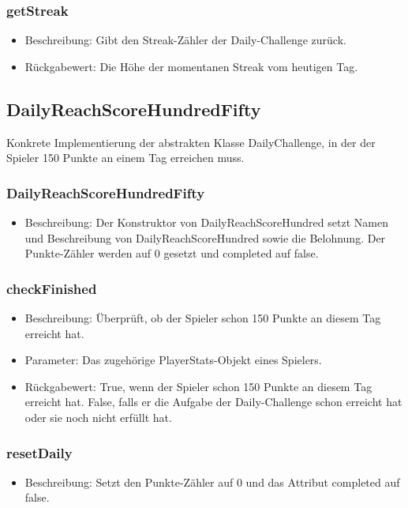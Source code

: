 \documentclass[a4paper]{scrreprt}
\begin{document}
	\subsubsection{getStreak}
	\begin{itemize}
		\item Beschreibung: Gibt den Streak-Zähler der Daily-Challenge zurück.
		\item Rückgabewert: Die Höhe der momentanen Streak vom heutigen Tag.
	\end{itemize}

	\subsection{DailyReachScoreHundredFifty}
	Konkrete Implementierung der abstrakten Klasse DailyChallenge, in der der Spieler 150 Punkte an einem Tag erreichen muss.
	\subsubsection{DailyReachScoreHundredFifty}
	\begin{itemize}
		\item Beschreibung: Der Konstruktor von DailyReachScoreHundred setzt Namen und Beschreibung von DailyReachScoreHundred sowie die Belohnung. Der Punkte-Zähler werden auf 0 gesetzt und completed auf false.
	\end{itemize}
	\subsubsection{checkFinished}
	\begin{itemize}
		\item Beschreibung: Überprüft, ob der Spieler schon 150 Punkte an diesem Tag erreicht hat.
		\item Parameter: Das zugehörige PlayerStats-Objekt eines Spielers.
		\item Rückgabewert: True, wenn der Spieler schon 150 Punkte an diesem Tag erreicht hat. False, falls er die Aufgabe der Daily-Challenge schon erreicht hat oder sie noch nicht erfüllt hat.
	\end{itemize}
	\subsubsection{resetDaily}
	\begin{itemize}
		\item Beschreibung: Setzt den Punkte-Zähler auf 0 und das Attribut completed auf false.
	\end{itemize}
\end{document}
